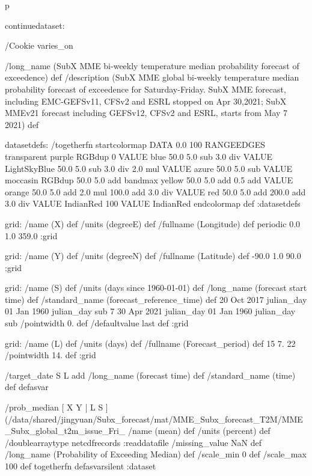 p
\begin{ingrid}

continuedataset:


/Cookie varies_on


/long_name (SubX MME bi-weekly temperature median probability forecast of exceedence) def
/description (SubX MME global bi-weekly temperature median probability forecast of exceedence for Saturday-Friday. SubX MME forecast, including EMC-GEFSv11, CFSv2 and ESRL stopped on Apr 30,2021; SubX MMEv21 forecast including GEFSv12, CFSv2 and ESRL, starts from May 7 2021) def

datasetdefs:
/togetherfn {
startcolormap 
DATA 0.0 100 RANGEEDGES
    transparent purple RGBdup
       0 VALUE
       blue 50.0
         5.0 sub
         3.0 div
         VALUE
         LightSkyBlue 50.0
          5.0 sub
          3.0 div
          2.0 mul
          VALUE
          azure 50.0
           5.0 sub
           VALUE
          moccasin RGBdup 50.0
             5.0 add
             bandmax
             yellow 50.0
              5.0 add
              0.5 add
              VALUE
              orange 50.0
               5.0 add
               2.0 mul
               100.0 add
               3.0 div
               VALUE
               red 50.0
                5.0 add
                200.0 add
                3.0 div
                VALUE
               IndianRed
                100 VALUE
                IndianRed
endcolormap
} def
:datasetdefs


grid:
/name (X) def
/units (degreeE) def
/fullname (Longitude) def
periodic
0.0 1.0 359.0
:grid

grid:
/name (Y) def
/units (degreeN) def
/fullname (Latitude) def
-90.0 1.0 90.0
:grid


grid:
/name (S) def
/units (days since 1960-01-01) def
/long_name (forecast start time) def
/standard_name (forecast_reference_time) def
20 Oct 2017 julian_day 01 Jan 1960 julian_day sub
7
30 Apr 2021 julian_day 01 Jan 1960 julian_day sub
/pointwidth 0. def
/defaultvalue { last } def
:grid

grid:
/name (L) def
/units (days) def
/fullname (Forecast_period) def
15 7. 22
/pointwidth 14. def
:grid

/target_date { S L add /long_name (forecast time) def /standard_name (time) def } defasvar


/prob_median {
[ X Y | L S ] (/data/shared/jingyuan/Subx_forecast/mat/MME_Subx_forecast_T2M/MME_Subx_global_t2m_issue_Fri_%
/name (mean) def
/units (percent) def
/doublearraytype netcdfrecords :readdatafile
/missing_value NaN def
/long_name (Probability of Exceeding Median) def
/scale_min 0 def
/scale_max 100 def
togetherfn
} defasvarsilent
:dataset
\end{ingrid}
